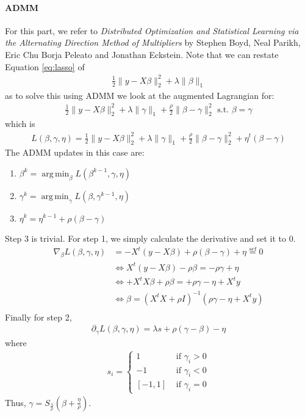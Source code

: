 \documentclass[12pt, leqno]{article}
\providecommand{\norm}[1]{\lVert#1\rVert} %
\DeclareMathOperator*{\argmin}{arg\,min}
\begin{document}
\paragraph{ADMM} For this part, we refer to {\it Distributed Optimization and Statistical
Learning via the Alternating Direction
Method of Multipliers} by Stephen Boyd, Neal Parikh, Eric Chu
Borja Peleato and Jonathan Eckstein. Note that we can restate
Equation \ref{eq:lasso} of
\begin{align*}
\frac{1}{2}\norm{y- X \beta}_2^2 + \lambda
  \norm{\beta}_1 
\end{align*}
as to solve this using ADMM we look at the augmented Lagrangian for: 
\begin{align*}
 \frac{1}{2}\norm{y- X \beta}_2^2 + \lambda
  \norm{\gamma}_1 + \frac{\rho}{2} \norm{\beta - \gamma}_2^2 \text{ s.t. } \beta = \gamma
\end{align*}
which is
\begin{align*}
L(\beta, \gamma, \eta) = \frac{1}{2}\norm{y- X \beta}_2^2 + \lambda
  \norm{\gamma}_1 + \frac{\rho}{2} \norm{\beta - \gamma}_2^2 + \eta^t(\beta - \gamma)
\end{align*}
The ADMM updates in this case are:
\begin{enumerate}
\item $\beta^{k} = \argmin_\beta L(\beta^{k-1}, \gamma, \eta)$
\item $\gamma^{k} = \argmin_\gamma L(\beta, \gamma^{k-1}, \eta)$
\item $\eta^{k} = \eta^{k-1}+ \rho(\beta - \gamma)$
\end{enumerate}
Step 3 is trivial. For step 1, we simply calculate the derivative and
set it to 0. 
\begin{align*}
\nabla_\beta L(\beta, \gamma, \eta) &=  -X^t (y -X \beta) + \rho (\beta
  - \gamma) + \eta \overset{set}{=} 0\\
&\iff X^t (y -X \beta) - \rho \beta = - \rho \gamma + \eta \\ 
&\iff + X^t X \beta + \rho \beta = + \rho \gamma - \eta + X^ty \\ 
&\iff \beta =  (X^t X + \rho I)^{-1}  (\rho \gamma - \eta + X^ty) \\ 
\end{align*}
Finally for step 2, 
\begin{align*}
\partial_\gamma L(\beta, \gamma, \eta) = \lambda s + \rho (\gamma -
  \beta)  - \eta
\end{align*}
where 
\begin{align*}
s_i = \begin{cases}
1 &\text{ if } \gamma_i > 0 \\
-1 &\text{ if } \gamma_i< 0 \\
[-1,1] &\text{ if } \gamma_i = 0
\end{cases}
\end{align*}
Thus, $\gamma = S_{\frac{\lambda}{\rho}}(\beta + \frac{\eta}{\rho})$.
\end{document}
